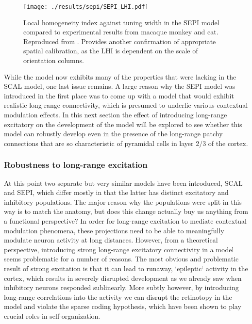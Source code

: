 \begin{figure}
	\centering
        \texttt{[image: ./results/sepi/SEPI\_LHI.pdf]}
	\caption{Local homogeneity index against tuning width in the SEPI
      model compared to experimental results from macaque monkey and
      cat. Reproduced from \cite{Nauhaus2008}. Provides another
      confirmation of appropriate spatial calibration, as the LHI is
      dependent on the scale of orientation columns.}
	\label{SEPILHI}
\end{figure}

While the model now exhibits many of the properties that were lacking
in the SCAL model, one last issue remains. A large reason why the SEPI
model was introduced in the first place was to come up with a model
that would exhibit realistic long-range connectivity, which is
presumed to underlie various contextual modulation effects. In this
next section the effect of introducing long-range excitatory on the
development of the model will be explored to see whether this model
can robustly develop even in the presence of the long-range patchy
connections that are so characteristic of pyramidal cells in layer 2/3
of the cortex.

\subsubsection*{Robustness to long-range excitation}

At this point two separate but very similar models have been
introduced, SCAL and SEPI, which differ mostly in that the latter has
distinct excitatory and inhibitory populations. The major reason why
the populations were split in this way is to match the anatomy, but
does this change actually buy us anything from a functional
perspective? In order for long-range excitation to mediate contextual
modulation phenomena, these projections need to be able to
meaningfully modulate neuron activity at long distances. However, from
a theoretical perspective, introducing strong long-range excitatory
connectivity in a model seems problematic for a number of reasons. The
most obvious and problematic result of strong excitation is that it
can lead to runaway, `epileptic` activity in the cortex, which results
in severely disrupted development as we already saw when inhibitory
neurons responded sublinearly. More subtly however, by introducing
long-range correlations into the activity we can disrupt the
retinotopy in the model and violate the sparse coding hypothesis,
which have been shown to play crucial roles in self-organization.

